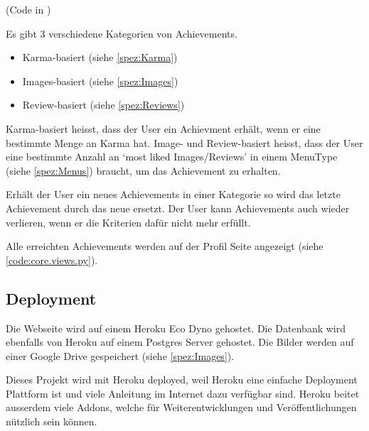 (Code in )

Es gibt 3 verschiedene Kategorien von Achievements.
\begin{itemize}
    \item Karma-basiert (siehe \ref{spez:Karma})
    \item Images-basiert (siehe \ref{spez:Images})
    \item Review-basiert (siehe \ref{spez:Reviews})
\end{itemize}

Karma-basiert heisst, dass der User ein Achievment erhält, wenn er eine
bestimmte Menge an Karma hat. Image- und Review-basiert heisst, dass der User
eine bestimmte Anzahl an `most liked Images/Reviews' in einem MenuType (siehe
\ref{spez:Menus}) braucht, um das Achievement zu erhalten.

Erhält der User ein neues Achievements in einer Kategorie so wird das letzte
Achievement durch das neue ersetzt. Der User kann Achievements auch wieder
verlieren, wenn er die Kriterien dafür nicht mehr erfüllt.

Alle erreichten Achievements werden auf der Profil Seite angezeigt (siehe
\ref{code:core.views.py}).



\subsection{Deployment}\label{spez:Deployment}

Die Webseite wird auf einem Heroku Eco Dyno gehostet. Die Datenbank wird ebenfalls
von Heroku auf einem Postgres Server gehostet. Die Bilder werden auf einer
Google Drive gespeichert (siehe \ref{spez:Images}).

Dieses Projekt wird mit Heroku deployed, weil Heroku eine einfache 
Deployment Plattform ist und viele Anleitung im Internet dazu verfügbar sind.
Heroku beitet ausserdem viele Addons, welche für Weiterentwicklungen und
Veröffentlichungen nützlich sein können.
